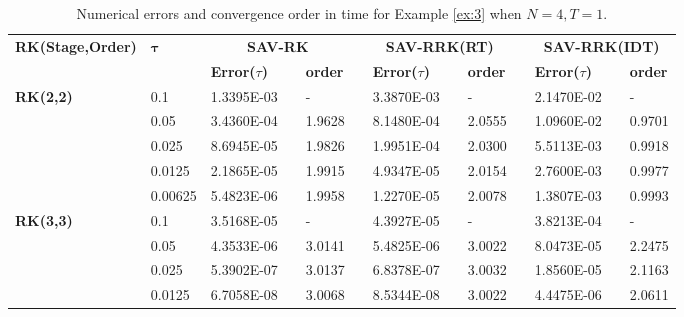 \begin{table}[H]\footnotesize
\centering
\caption{Numerical errors and convergence order in time for Example \ref{ex:3} when $N=4, T = 1$.}
\begin{tabular}{lllllrlrlrlrlrl}
\toprule
\multicolumn{2}{l}{\multirow{2}[3]{*}{\textbf{RK(Stage,Order)}}} & \multicolumn{2}{l}{\multirow{2}[3]{*}{$\bm{\tau}$}} & \multicolumn{3}{c}{\textbf{SAV-RK}} &       & \multicolumn{3}{c}{\textbf{SAV-RRK(RT)}} &       & \multicolumn{3}{c}{\textbf{SAV-RRK(IDT)}} \\
\cmidrule{5-7}\cmidrule{9-11}\cmidrule{13-15}    \multicolumn{2}{l}{} & \multicolumn{2}{l}{} & \textbf{Error($\tau$)} &       & \textbf{order} &       & \textbf{Error($\tau$)} &       & \textbf{order} &       & \textbf{Error($\tau$)} &       & \textbf{order} \\
\hline
\multicolumn{2}{l}{\multirow{5}[0]{*}{\textbf{RK(2,2)}}} & \multicolumn{2}{l}{0.1} & 1.3395E-03 &       & -     &       & 3.3870E-03 &       & -     &       & 2.1470E-02 &       & - \\
\multicolumn{2}{l}{} & \multicolumn{2}{l}{0.05} & 3.4360E-04 &       & 1.9628  &       & 8.1480E-04 &       & 2.0555  &       & 1.0960E-02 &       & 0.9701  \\
\multicolumn{2}{l}{} & \multicolumn{2}{l}{0.025} & 8.6945E-05 &       & 1.9826  &       & 1.9951E-04 &       & 2.0300  &       & 5.5113E-03 &       & 0.9918  \\
\multicolumn{2}{l}{} & \multicolumn{2}{l}{0.0125} & 2.1865E-05 &       & 1.9915  &       & 4.9347E-05 &       & 2.0154  &       & 2.7600E-03 &       & 0.9977  \\
\multicolumn{2}{l}{} & \multicolumn{2}{l}{0.00625} & 5.4823E-06 &       & 1.9958  &       & 1.2270E-05 &       & 2.0078  &       & 1.3807E-03 &       & 0.9993  \\
\multicolumn{2}{l}{\multirow{5}[0]{*}{\textbf{RK(3,3)}}} & \multicolumn{2}{l}{0.1} & 3.5168E-05 &       & -     &       & 4.3927E-05 &       & -     &       & 3.8213E-04 &       & - \\
\multicolumn{2}{l}{} & \multicolumn{2}{l}{0.05} & 4.3533E-06 &       & 3.0141  &       & 5.4825E-06 &       & 3.0022  &       & 8.0473E-05 &       & 2.2475  \\
\multicolumn{2}{l}{} & \multicolumn{2}{l}{0.025} & 5.3902E-07 &       & 3.0137  &       & 6.8378E-07 &       & 3.0032  &       & 1.8560E-05 &       & 2.1163  \\
\multicolumn{2}{l}{} & \multicolumn{2}{l}{0.0125} & 6.7058E-08 &       & 3.0068  &       & 8.5344E-08 &       & 3.0022  &       & 4.4475E-06 &       & 2.0611  \\

\end{tabular}
\end{table}
